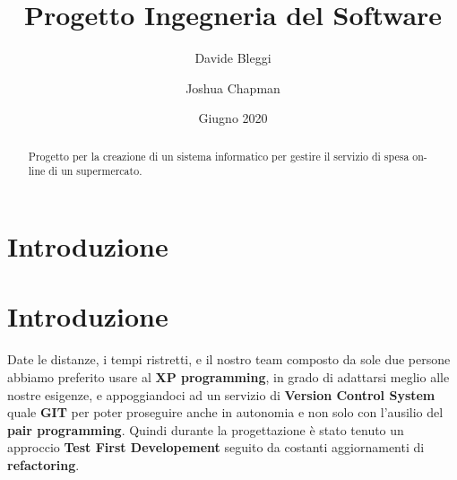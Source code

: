 \documentclass[12pt, a4paper]{article}
\title{Progetto Ingegneria del Software}
\author{Davide Bleggi \and Joshua Chapman}
\date{Giugno 2020}
\numberwithin{equation}{section} %
\begin{document}
\begin{titlepage}
  \maketitle
\end{titlepage}

\begin{abstract}
  Progetto per la creazione di un sistema informatico per gestire il servizio 
  di spesa on-line di un supermercato.
\end{abstract}

\tableofcontents
\newpage

\section{Introduzione}

\tableofcontents
\newpage


\section{Introduzione}
Date le distanze, i tempi ristretti, e il nostro team composto da sole due persone abbiamo preferito usare al \textbf{XP programming}, in grado di adattarsi meglio alle nostre esigenze, e appoggiandoci ad un servizio di \textbf{Version Control System} quale \textbf{GIT} per poter proseguire anche in autonomia e non solo con l'ausilio del \textbf{pair programming}. Quindi durante la progettazione è stato tenuto un approccio \textbf{Test First Developement} seguito da costanti aggiornamenti di \textbf{refactoring}.
\end{document}
